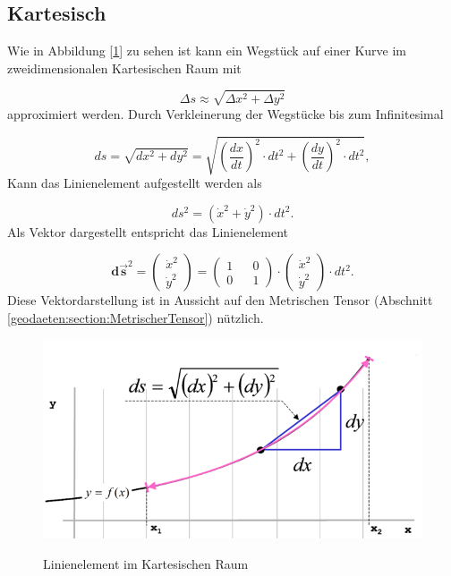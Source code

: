 %
%
%
%
\usepackage{graphicx}
\subsection{Kartesisch\label{geodaeten:section:LinKartesisch}}

Wie in Abbildung [\ref{geodaeten:Linienelemente:figure1}] zu sehen ist kann ein Wegstück auf einer Kurve im zweidimensionalen Kartesischen Raum mit

\begin{equation}
	\Delta s \approx \sqrt{\Delta x^2 + \Delta y^2}
\end{equation}
approximiert werden.
Durch Verkleinerung der Wegstücke bis zum Infinitesimal 

\begin{equation}
	d s = \sqrt{d x^2 + d y^2}
	= \sqrt{\left(\frac{d x}{d t}\right)^2 \cdot d t^2 + \left(\frac{d y}{d t}\right)^2 \cdot d t^2} ,
\end{equation}
Kann das Linienelement aufgestellt werden als

\begin{equation}
 	ds^2 = \left(\dot{x}^2 +\dot{y}^2\right) \cdot dt^2 .
\end{equation}
Als Vektor dargestellt entspricht das Linienelement

\begin{equation}
	\mathbf{d\vec{s}}^2 = \begin{pmatrix} \dot{x}^2 \\ \dot{y}^2 \end{pmatrix} = \begin{pmatrix} 1 && 0 \\ 0 && 1 \end{pmatrix} \cdot \begin{pmatrix} \dot{x}^2 \\ \dot{y}^2 \end{pmatrix} \cdot dt^2 .
\end{equation}
Diese Vektordarstellung ist in Aussicht auf den Metrischen Tensor (Abschnitt \ref{geodaeten:section:MetrischerTensor}) nützlich.


\begin{figure}
	\centering
	\includegraphics[width=0.7\linewidth]{papers/geodaeten/Abbildungen/Linienelemente/LinKartes1}
	\caption{Linienelement im Kartesischen Raum}
	\label{geodaeten:Linienelemente:figure1}
	\cite{geodaeten:kartesisch}
\end{figure}
